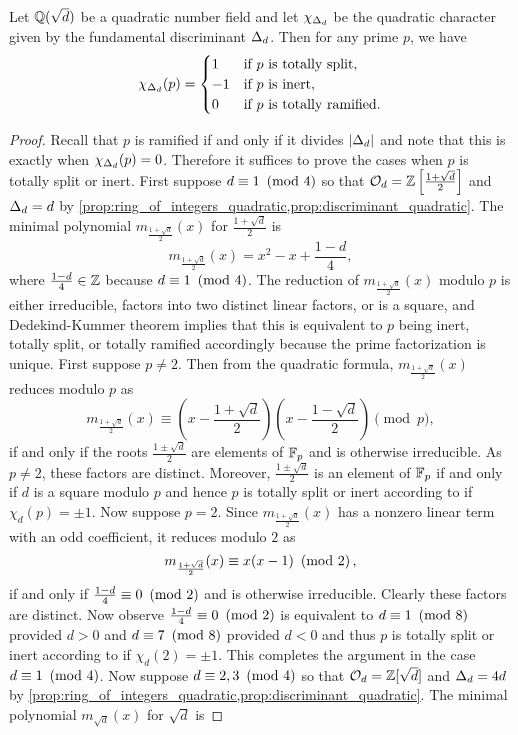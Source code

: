     \begin{proposition}\label{prop:factorization_of_primes_quadratic}
      Let $\mathbb{Q}(\sqrt{d})$ be a quadratic number field and let $\chi_{\Delta_{d}}$ be the quadratic character given by the fundamental discriminant $\Delta_{d}$. Then for any prime $p$, we have
      \[
        \chi_{\Delta_{d}}(p) = \begin{cases} 1 & \text{if $p$ is totally split}, \\ -1 & \text{if $p$ is inert}, \\ 0 & \text{if $p$ is totally ramified}. \end{cases}
      \]
    \end{proposition}
    \begin{proof}
      Recall that $p$ is ramified if and only if it divides $|\Delta_{d}|$ and note that this is exactly when $\chi_{\Delta_{d}}(p) = 0$. Therefore it suffices to prove the cases when $p$ is totally split or inert. First suppose $d \equiv 1 \ \left(\text{mod }4\right)$ so that $\mathcal{O}_{d} = \mathbb{Z}\left[\frac{1+\sqrt{d}}{2}\right]$ and $\Delta_{d} = d$ by \cref{prop:ring_of_integers_quadratic,prop:discriminant_quadratic}. The minimal polynomial $m_{\frac{1+\sqrt{d}}{2}}(x)$ for $\frac{1+\sqrt{d}}{2}$ is
      \[
        m_{\frac{1+\sqrt{d}}{2}}(x) = x^{2}-x+\frac{1-d}{4},
      \]
      where $\frac{1-d}{4} \in \mathbb{Z}$ because $d \equiv 1 \ \left(\text{mod }4\right)$. The reduction of $m_{\frac{1+\sqrt{d}}{2}}(x)$ modulo $p$ is either irreducible, factors into two distinct linear factors, or is a square, and Dedekind-Kummer theorem implies that this is equivalent to $p$ being inert, totally split, or totally ramified accordingly because the prime factorization is unique. First suppose $p \neq 2$. Then from the quadratic formula, $m_{\frac{1+\sqrt{d}}{2}}(x)$ reduces modulo $p$ as
      \[
        m_{\frac{1+\sqrt{d}}{2}}(x) \equiv \left(x-\frac{1+\sqrt{d}}{2}\right)\left(x-\frac{1-\sqrt{d}}{2}\right) \pmod{p},
      \]
      if and only if the roots $\frac{1\pm\sqrt{d}}{2}$ are elements of $\mathbb{F}_{p}$ and is otherwise irreducible. As $p \neq 2$, these factors are distinct. Moreover, $\frac{1\pm\sqrt{d}}{2}$ is an element of $\mathbb{F}_{p}$ if and only if $d$ is a square modulo $p$ and hence $p$ is totally split or inert according to if $\chi_{d}(p) = \pm1$. Now suppose $p = 2$. Since $m_{\frac{1+\sqrt{d}}{2}}(x)$ has a nonzero linear term with an odd coefficient, it reduces modulo $2$ as
      \[
        m_{\frac{1+\sqrt{d}}{2}}(x) \equiv x(x-1) \ \left(\text{mod }2\right),
      \]
      if and only if $\frac{1-d}{4} \equiv 0 \ \left(\text{mod }2\right)$ and is otherwise irreducible. Clearly these factors are distinct. Now observe $\frac{1-d}{4} \equiv 0 \ \left(\text{mod }2\right)$ is equivalent to $d \equiv 1 \ \left(\text{mod }8\right)$ provided $d > 0$ and $d \equiv 7 \ \left(\text{mod }8\right)$ provided $d < 0$ and thus $p$ is totally split or inert according to if $\chi_{d}(2) = \pm1$. This completes the argument in the case $d \equiv 1 \ \left(\text{mod }4\right)$. Now suppose $d \equiv 2,3 \ \left(\text{mod }4\right)$ so that $\mathcal{O}_{d} = \mathbb{Z}[\sqrt{d}]$ and $\Delta_{d} = 4d$ by \cref{prop:ring_of_integers_quadratic,prop:discriminant_quadratic}. The minimal polynomial $m_{\sqrt{d}}(x)$ for $\sqrt{d}$ is

\end{proof}
